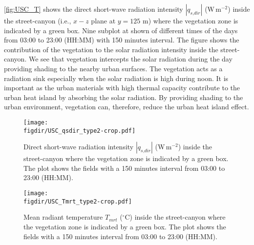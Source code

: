 \cref{fig:USC_T} shows the direct short-wave radiation intensity $|q_{\textit{s,dir}}|$ (W\,m$^{-2}$) inside the street-canyon (i.e., $x-z$ plane at $y=125$ m) where the vegetation zone is indicated by a green box. Nine subplot at shown of different times of the days from 03:00 to 23:00 (HH:MM) with 150 minutes interval. The figure shows the contribution of the vegetation to the solar radiation intensity inside the street-canyon. We see that vegetation intercepts the solar radiation during the day providing shading to the nearby urban surfaces. The vegetation acts as a radiation sink especially when the solar radiation is high during noon. It is important as the urban materials with high thermal capacity contribute to the urban heat island by absorbing the solar radiation. By providing shading to the urban environment, vegetation can, therefore, reduce the urban heat island effect.  

\begin{sidewaysfigure}[p]
	\centering
	\texttt{[image: \\figdir/USC\_qsdir\_type2-crop.pdf]}
	\caption{Direct short-wave radiation intensity $|q_{\textit{s,dir}}|$ (W\,m$^{-2}$) inside the street-canyon where the vegetation zone is indicated by a green box. The plot shows the fields with a 150 minutes interval from 03:00 to 23:00 (HH:MM).}
	\label{fig:USC_qrdir}
\end{sidewaysfigure}

\begin{sidewaysfigure}[p]
	\centering
	\texttt{[image: \\figdir/USC\_Tmrt\_type2-crop.pdf]}
	\caption{Mean radiant temperature $T_{\textit{mrt}}$  ($^{\circ}$C) inside the street-canyon where the vegetation zone is indicated by a green box. The plot shows the fields with a 150 minutes interval from 03:00 to 23:00 (HH:MM).}
	\label{fig:USC_Tmrt}
\end{sidewaysfigure}


